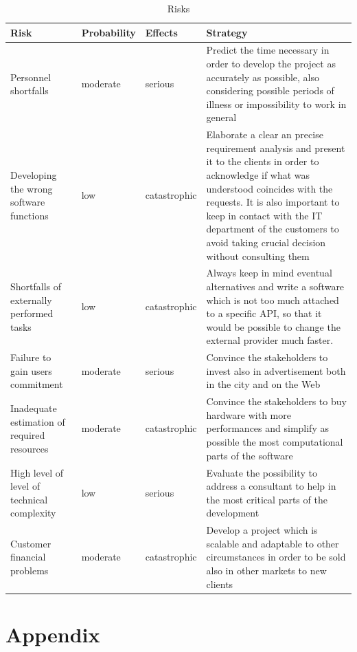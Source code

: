 \documentclass[a4paper]{article}
\begin{document}
\begin{table} [H]
\begin{center}
\begin{tabular}{ |M{.25\textwidth}|M{.13\textwidth}|M{.14\textwidth}|M{.36\textwidth}|  }
\hline \textbf{Risk} & \textbf{Probability} & \textbf{Effects} & \textbf{Strategy} \\ \hline
	\hline  Personnel shortfalls & moderate & serious & Predict the time necessary in order to develop the project
	as accurately as possible, also considering possible periods of illness or impossibility to work in general \\ 
	\hline Developing the wrong software functions & low & catastrophic & Elaborate a clear an precise requirement analysis 
	and present it to the clients in order to acknowledge if what was understood coincides with the requests. It is also
	important to keep in contact with the IT department of the customers to avoid taking crucial decision without consulting them\\
	\hline  Shortfalls of externally performed tasks & low & catastrophic & Always keep in mind eventual alternatives and write a software
	which is not too much attached to a specific API, so that it would be possible to change the external provider much faster. \\
	\hline Failure to gain users commitment & moderate & serious & Convince the stakeholders to invest also in advertisement both
	in the city and on the Web\\
	\hline Inadequate estimation of required resources & moderate & catastrophic & Convince the stakeholders to buy hardware with
	more performances and simplify as possible the most computational parts of the software\\
	\hline  High level of level of technical complexity & low & serious & Evaluate the possibility to address a consultant to help in the
	most critical parts of the development\\
	\hline Customer financial problems & moderate & catastrophic & Develop a project which is scalable and adaptable to other circumstances
	in order to be sold also in other markets to new clients\\
	\hline
\end{tabular}
\end{center}
\caption{Risks}
\label{table:risks}
\end{table}


\section{Appendix}
\end{document}
